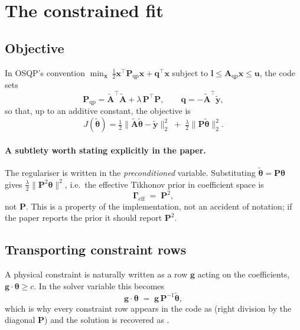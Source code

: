 \documentclass[11pt,a4paper]{article}
\newcommand{\jl}[1]{\path{#1}}
\begin{document}
\section{The constrained fit}
\label{sec:qp}

\subsection{Objective}

In OSQP's convention $\min_{\bm x}\ \tfrac12\bm x^{\!\top}\bm P_{\!\mathrm{qp}}\bm x+\bm q^{\!\top}\bm x$
subject to $\bm l\le \bm A_{\mathrm{qp}}\bm x\le \bm u$, the code sets
\begin{equation}
\bm P_{\!\mathrm{qp}} = \tilde{\bm A}^{\!\top}\tilde{\bm A} + \lambda\,\bm P^{\!\top}\bm P,
\qquad
\bm q = -\tilde{\bm A}^{\!\top}\tilde{\bm y},
\end{equation}
so that, up to an additive constant, the objective is
\begin{equation}
J(\tilde{\bm\theta})
= \tfrac12\big\|\tilde{\bm A}\tilde{\bm\theta}-\tilde{\bm y}\big\|_2^{2}
\;+\;\tfrac{\lambda}{2}\big\|\bm P\tilde{\bm\theta}\big\|_2^{2}.
\label{eq:objective}
\end{equation}

\paragraph{A subtlety worth stating explicitly in the paper.}
The regulariser is written in the \emph{preconditioned} variable. Substituting
$\tilde{\bm\theta}=\bm P\bm\theta$ gives
$\tfrac{\lambda}{2}\|\bm P^{2}\bm\theta\|^{2}$, i.e.\ the effective Tikhonov prior in
coefficient space is
\begin{equation}
\bm\Gamma_{\mathrm{eff}} \;=\; \bm P^{2},
\label{eq:gammaeff}
\end{equation}
not $\bm P$. This is a property of the implementation, not an accident of notation; if
the paper reports the prior it should report $\bm P^{2}$.

\subsection{Transporting constraint rows}

A physical constraint is naturally written as a row $\bm g$ acting on the coefficients,
$\bm g\cdot\bm\theta \ge c$. In the solver variable this becomes
\begin{equation}
\bm g\cdot\bm\theta \;=\; \bm g\,\bm P^{-1}\tilde{\bm\theta},
\end{equation}
which is why every constraint row appears in the code as \jl{row/P} (right division by
the diagonal $\bm P$) and the solution is recovered as \jl{P \ r.x}.
\end{document}
